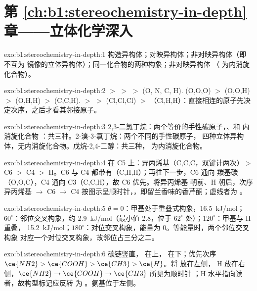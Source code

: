 \section*{第 \ref{ch:b1:stereochemistry-in-depth} 章——立体化学深入}

\begin{solution}{exo:b1:stereochemistry-in-depth:1}
构造异构体；对映异构体；非对映异构体（即不互为
镜像的立体异构体）；同一化合物的两种构象；非对映异构体
（ 为内消旋化合物）。
\end{solution}

\begin{solution}{exo:b1:stereochemistry-in-depth:2}
 $>$  $>$  $>$  (O, N, C, H).
 (O,O,O) $>$  (O,O,H) $>$  (O,H,H) $>$
 (C,C,H).  $>$  $>$  (Cl,Cl,Cl)
$>$ （Cl,H,H）：直接相连的原子先决定次序，之后才看其邻接原子。
\end{solution}

\begin{solution}{exo:b1:stereochemistry-in-depth:3}
2,3-二氯丁烷：两个等价的手性碳原子，、和
内消旋化合物 ：共三种。2-溴-3-氯丁烷：两个不同的手性碳原子，
四种立体异构体，无内消旋化合物。戊烷-2,4-二醇：共三种，
为内消旋化合物。
\end{solution}

\begin{solution}{exo:b1:stereochemistry-in-depth:4}
在 C5 上：异丙烯基（C,C,C，双键计两次）$>$ C6 $>$ C4
$>$ H。C6 与 C4 都带有（C,H,H）；再往下一步，C6 通向
羰基碳（O,O,C），C4 通向 C3（C,C,H），故 C6 优先。将异丙烯基
朝前、H 朝后，次序异丙烯基 $\to$ C6 $\to$ C4
按图示呈顺时针，，即留兰香味的香芹酮；虚线者为
。
\end{solution}

\begin{solution}{exo:b1:stereochemistry-in-depth:5}
$\theta = 0$：甲基处于重叠式构象，\qty{16.5}{kJ/mol}；$60^\circ$：邻位交叉构象，约
\qty{2.9}{kJ/mol}（最小值 2.8，位于 $62^\circ$ 处）；$120^\circ$：甲基与 H 重叠，
\qty{15.2}{kJ/mol}；$180^\circ$：对位交叉构象，能量为 0。等能量时，两个邻位交叉构象
对应一个对位交叉构象，故邻位占三分之二。
\end{solution}

\begin{solution}{exo:b1:stereochemistry-in-depth:6}
碳链竖直， 在上， 在下；优先次序
$\ce{NH2} > \ce{COOH} > \ce{CH3} > \ce{H}$。将  放在左侧，
H 放在右侧，$\ce{NH2} \to \ce{COOH} \to \ce{CH3}$ 所见为顺时针
；H 水平指向读者，故构型标记应反转
为 。氨基位于左侧。
\end{solution}

